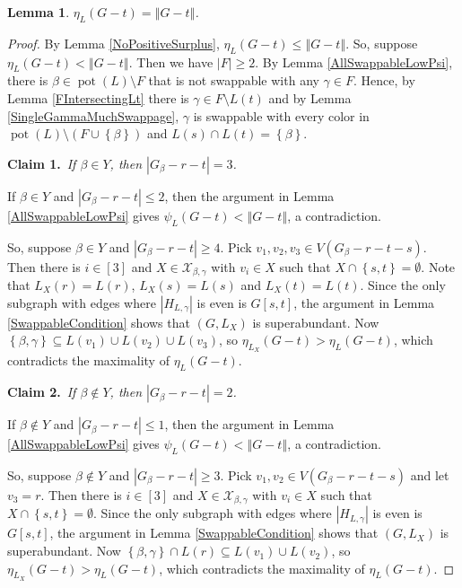 \documentclass[12pt]{article}
\theoremstyle{plain}
\newtheorem{lem}[thm]{Lemma}
\theoremstyle{definition}
\theoremstyle{remark}
\newcommand{\fancy}[1]{\mathcal{#1}}
\newcommand{\set}[1]{\left\{ #1 \right\}}
\newcommand{\card}[1]{\left|#1\right|}
\newcommand{\size}[1]{\left\Vert#1\right\Vert}
\newcommand{\irange}[1]{\left[#1\right]}
\newcommand{\parens}[1]{\left( #1 \right)}
\newcommand{\pot}{\operatorname{pot}}
\def\X{\fancy{X}}
\newcommand{\claim}[2]{{\bf Claim #1.}~{\it #2}~~}
\begin{document}
	\begin{lem}\label{EtaIsBig}
		$\eta_L(G - t) = \size{G - t}$.
	\end{lem}
	\begin{proof}
		By Lemma \ref{NoPositiveSurplus}, $\eta_L(G - t) \le \size{G - t}$.	So, suppose $\eta_L(G - t) < \size{G - t}$. Then we have $\card{F} \ge 2$. By Lemma \ref{AllSwappableLowPsi}, there is $\beta \in \pot(L) \setminus F$ that is not swappable with any $\gamma \in F$.  Hence, by Lemma \ref{FIntersectingLt} there is $\gamma \in F \setminus L(t)$ and by Lemma \ref{SingleGammaMuchSwappage}, $\gamma$ is swappable with every color in $\pot(L) \setminus \parens{F \cup \set{\beta}}$ and $L(s) \cap L(t) = \set{\beta}$.
		
		\claim{1}{If $\beta \in Y$, then $\card{G_\beta - r - t} = 3$.}
		
			If $\beta \in Y$ and $\card{G_\beta - r - t} \le 2$, then the argument in Lemma \ref{AllSwappableLowPsi} gives $\psi_L(G - t) < \size{G - t}$, a contradiction.
			
			So, suppose $\beta \in Y$ and $\card{G_\beta - r - t} \ge 4$.  Pick $v_1, v_2, v_3 \in V(G_\beta - r - t - s)$.  Then there is $i \in \irange{3}$ and $X \in \X_{\beta,\gamma}$ with $v_i \in X$ such that $X \cap \set{s,t} = \emptyset$. Note that $L_X(r) = L(r)$, $L_X(s) = L(s)$ and $L_X(t) = L(t)$.  Since the only subgraph with edges where $\card{H_{L, \gamma}}$ is even is $G[s, t]$, the argument in Lemma \ref{SwappableCondition} shows that $(G,L_X)$ is superabundant.  Now $\set{\beta, \gamma} \subseteq L(v_1) \cup L(v_2) \cup L(v_3)$, so $\eta_{L_X}(G - t) > \eta_L(G - t)$, which contradicts the maximality of $\eta_L(G - t)$.
			
		\claim{2}{If $\beta \not \in Y$, then $\card{G_\beta - r - t} = 2$.}
		
		If $\beta \not \in Y$ and $\card{G_\beta - r - t} \le 1$, then the argument in Lemma \ref{AllSwappableLowPsi} gives $\psi_L(G - t) < \size{G - t}$, a contradiction.
		
		So, suppose $\beta \not \in Y$ and $\card{G_\beta - r - t} \ge 3$. Pick $v_1, v_2 \in V(G_\beta - r - t - s)$ and let $v_3 = r$.  Then there is $i \in \irange{3}$ and $X \in \X_{\beta,\gamma}$ with $v_i \in X$ such that $X \cap \set{s,t} = \emptyset$.  Since the only subgraph with edges where $\card{H_{L, \gamma}}$ is even is $G[s, t]$, the argument in Lemma \ref{SwappableCondition} shows that $(G,L_X)$ is superabundant.  Now $\set{\beta, \gamma} \cap L(r) \subseteq L(v_1) \cup L(v_2)$, so $\eta_{L_X}(G - t) > \eta_L(G - t)$, which contradicts the maximality of $\eta_L(G - t)$.
		

\end{proof}
\end{document}
